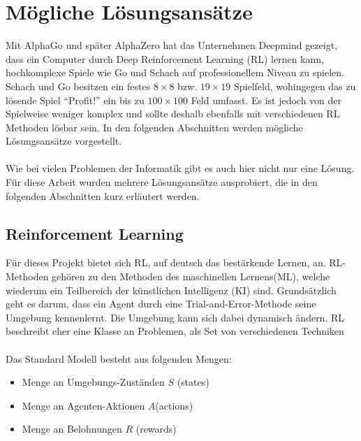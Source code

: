 \section{Mögliche Lösungsansätze}\label{cap:loesungsansatze}
Mit AlphaGo und später AlphaZero hat das Unternehmen Deepmind gezeigt, dass ein Computer durch Deep Reinforcement Learning (RL) lernen kann, hochkomplexe Spiele wie Go und Schach auf professionellem Niveau zu spielen.  \\
Schach und Go besitzen ein festes $8\times8$ bzw. $19\times19$ Spielfeld, wohingegen das zu lösende Spiel “Profit!” ein bis zu $100\times100$ Feld umfasst. Es ist jedoch von der Spielweise weniger komplex und sollte deshalb ebenfalls mit verschiedenen RL Methoden lösbar sein. In den folgenden Abschnitten werden mögliche Lösungsansätze vorgestellt. 
\\\\
Wie bei vielen Problemen der Informatik gibt es auch hier nicht nur eine Lösung. Für diese Arbeit wurden mehrere Lösungsansätze ausprobiert, die in den folgenden Abschnitten kurz erläutert werden.

\subsection{Reinforcement Learning}
Für dieses Projekt bietet sich RL, auf deutsch das bestärkende Lernen, an. RL-Methoden gehören zu den Methoden des maschinellen Lernens(ML), welche wiederum ein Teilbereich der künstlichen Intelligenz (KI) sind. Grundsätzlich geht es darum, dass ein Agent durch eine Trial-and-Error-Methode seine Umgebung kennenlernt. Die Umgebung kann sich dabei dynamisch ändern. RL beschreibt eher eine Klasse an Problemen, als Set von verschiedenen Techniken 
\\\\
Das Standard Modell besteht aus folgenden Mengen:
\begin{itemize}
	\item Menge an Umgebungs-Zuständen $S$ (states)
	\item Menge an Agenten-Aktionen $A$(actions)
	\item Menge an Belohnungen $R$ (rewards)
\end{itemize}

